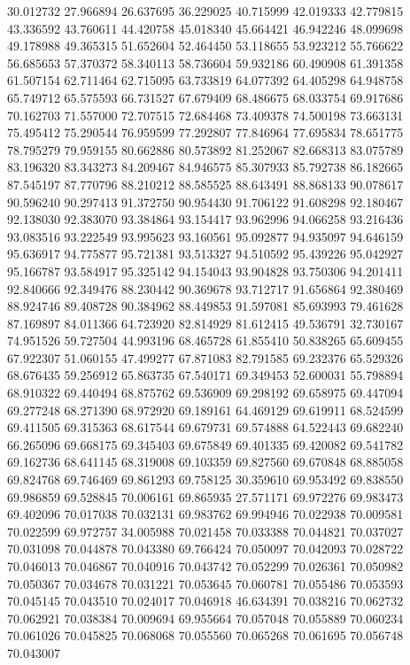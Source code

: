 30.012732
27.966894
26.637695
36.229025
40.715999
42.019333
42.779815
43.336592
43.760611
44.420758
45.018340
45.664421
46.942246
48.099698
49.178988
49.365315
51.652604
52.464450
53.118655
53.923212
55.766622
56.685653
57.370372
58.340113
58.736604
59.932186
60.490908
61.391358
61.507154
62.711464
62.715095
63.733819
64.077392
64.405298
64.948758
65.749712
65.575593
66.731527
67.679409
68.486675
68.033754
69.917686
70.162703
71.557000
72.707515
72.684468
73.409378
74.500198
73.663131
75.495412
75.290544
76.959599
77.292807
77.846964
77.695834
78.651775
78.795279
79.959155
80.662886
80.573892
81.252067
82.668313
83.075789
83.196320
83.343273
84.209467
84.946575
85.307933
85.792738
86.182665
87.545197
87.770796
88.210212
88.585525
88.643491
88.868133
90.078617
90.596240
90.297413
91.372750
90.954430
91.706122
91.608298
92.180467
92.138030
92.383070
93.384864
93.154417
93.962996
94.066258
93.216436
93.083516
93.222549
93.995623
93.160561
95.092877
94.935097
94.646159
95.636917
94.775877
95.721381
93.513327
94.510592
95.439226
95.042927
95.166787
93.584917
95.325142
94.154043
93.904828
93.750306
94.201411
92.840666
92.349476
88.230442
90.369678
93.712717
91.656864
92.380469
88.924746
89.408728
90.384962
88.449853
91.597081
85.693993
79.461628
87.169897
84.011366
64.723920
82.814929
81.612415
49.536791
32.730167
74.951526
59.727504
44.993196
68.465728
61.855410
50.838265
65.609455
67.922307
51.060155
47.499277
67.871083
82.791585
69.232376
65.529326
68.676435
59.256912
65.863735
67.540171
69.349453
52.600031
55.798894
68.910322
69.440494
68.875762
69.536909
69.298192
69.658975
69.447094
69.277248
68.271390
68.972920
69.189161
64.469129
69.619911
68.524599
69.411505
69.315363
68.617544
69.679731
69.574888
64.522443
69.682240
66.265096
69.668175
69.345403
69.675849
69.401335
69.420082
69.541782
69.162736
68.641145
68.319008
69.103359
69.827560
69.670848
68.885058
69.824768
69.746469
69.861293
69.758125
30.359610
69.953492
69.838550
69.986859
69.528845
70.006161
69.865935
27.571171
69.972276
69.983473
69.402096
70.017038
70.032131
69.983762
69.994946
70.022938
70.009581
70.022599
69.972757
34.005988
70.021458
70.033388
70.044821
70.037027
70.031098
70.044878
70.043380
69.766424
70.050097
70.042093
70.028722
70.046013
70.046867
70.040916
70.043742
70.052299
70.026361
70.050982
70.050367
70.034678
70.031221
70.053645
70.060781
70.055486
70.053593
70.045145
70.043510
70.024017
70.046918
46.634391
70.038216
70.062732
70.062921
70.038384
70.009694
69.955664
70.057048
70.055889
70.060234
70.061026
70.045825
70.068068
70.055560
70.065268
70.061695
70.056748
70.043007
